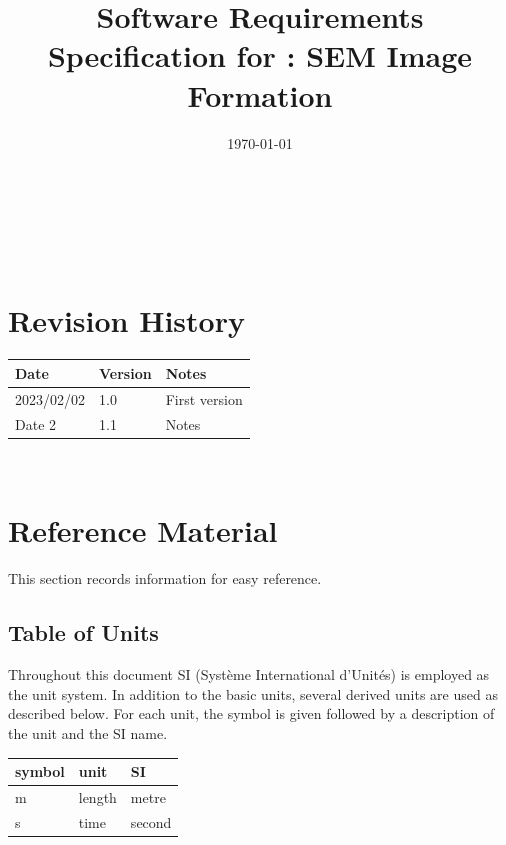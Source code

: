 \documentclass[12pt]{article}
\begin{document}
\title{Software Requirements Specification for \progname: SEM Image Formation} 
\author{\authname}
\date{\today}
	
\maketitle

~\newpage


\tableofcontents

~\newpage

\section*{Revision History}

\begin{tabularx}{\textwidth}{p{3cm}p{2cm}X}
\toprule {\bf Date} & {\bf Version} & {\bf Notes}\\
\midrule
2023/02/02 & 1.0 & First version\\
Date 2 & 1.1 & Notes\\
\bottomrule
\end{tabularx}

~\newpage

\section{Reference Material}

This section records information for easy reference.

\subsection{Table of Units}

Throughout this document SI (Syst\`{e}me International d'Unit\'{e}s) is employed
as the unit system.  In addition to the basic units, several derived units are
used as described below.  For each unit, the symbol is given followed by a
description of the unit and the SI name.
~\newline

\renewcommand{\arraystretch}{1.2}
  \noindent \begin{tabular}{l l l} 
    \toprule		
    \textbf{symbol} & \textbf{unit} & \textbf{SI}\\
    \midrule 
    \si{\metre} & length & metre\\
    \si{\second} & time & second\\
    \bottomrule
  \end{tabular}
~\newline
 
\end{document}
